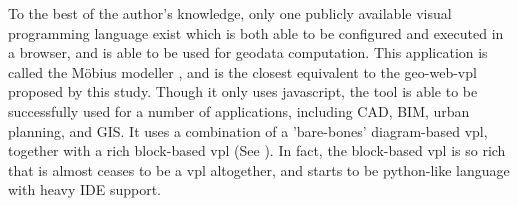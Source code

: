 To the best of the author's knowledge, only one publicly available visual programming language exist which is both able to be configured and executed in a browser, and is able to be used for geodata computation.
This application is called the Möbius modeller \citep{janssen_mobius_2021}, and is the closest equivalent to the geo-web-vpl proposed by this study.
Though it only uses javascript, the tool is able to be successfully used for a number of applications, including CAD, BIM, urban planning, and GIS. 
It uses a combination of a 'bare-bones' diagram-based vpl, together with a rich block-based vpl (See ).
In fact, the block-based vpl is so rich that is almost ceases to be a vpl altogether, and starts to be python-like language with heavy IDE support.  



